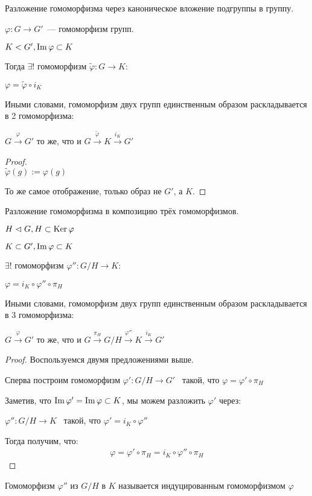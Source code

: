 \begin{theorem-non}
    Разложение гомоморфизма через каноническое вложение подгруппы в группу. 

    $\varphi: G \to G'$~--- гомоморфизм групп.

    $K < G', \operatorname{Im} \varphi \subset K$

    Тогда $\exists !$ гомоморфизм $\tilde{\varphi}: G \to K:$

    $\varphi = \tilde{\varphi} \circ i_K$

    Иными словами, гомоморфизм двух групп единственным образом раскладывается в 2 гомоморфизма:

    $G \stackrel{\varphi}{\to} G'$ то же, что и $G \stackrel{\tilde{\varphi}}{\to} K \stackrel{i_{K}}{\to} G'$

    \begin{proof}
        $ $ \\
        $\tilde{\varphi}(g) := \varphi(g)$
        
        То же самое отображение, только образ не $G'$, а $K$.
        
    \end{proof}
\end{theorem-non}

\begin{theorem-non}
    Разложение гомоморфизма в композицию трёх гомоморфизмов.

    $H \vartriangleleft G, H \subset \operatorname{Ker} \varphi$

    $K \subset G', \operatorname{Im} \varphi \subset K$

    $\exists !$ гомоморфизм $\varphi'': G / H \to K:$

    $\varphi =  i_K \circ \varphi'' \circ \pi_H$

    Иными словами, гомоморфизм двух групп единственным образом раскладывается в 3 гомоморфизма:

    $G \stackrel{\varphi}{\to} G'$ то же, что и $G \stackrel{\pi_{H}}{\to} G/H \stackrel{\varphi''}{\to} K \stackrel{i_{K}}{\to} G'$

    \begin{proof}
        Воспользуемся двумя предложениями выше.

        Сперва построим гомоморфизм $\varphi': G / H \to G'$ \, такой, что $\varphi = \varphi' \circ \pi_H$

        Заметив, что $\operatorname{Im} \varphi' = \operatorname{Im} \varphi \subset K$, мы можем разложить $\varphi'$ через:

        $\varphi'': G / H \to K$ \, такой, что $\varphi' = i_K \circ \varphi''$

        Тогда получим, что: 
        \begin{gather*}
            \varphi = \varphi' \circ \pi_H = i_K \circ \varphi'' \circ \pi_H
        \end{gather*}
    \end{proof}

    \notice Гомоморфизм $\varphi''$ из $G / H$ в $K$ называется индуцированным гомоморфизмом $\varphi$
\end{theorem-non}

